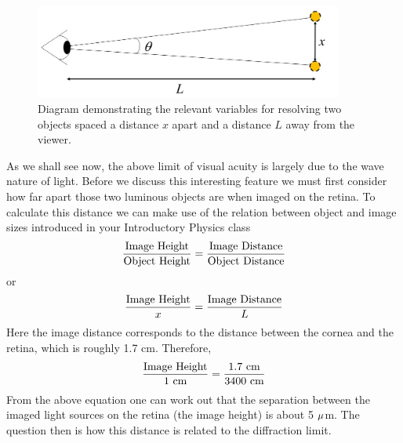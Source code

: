\begin{figure}[b]
	\centering
	\includegraphics[width=4.0in]{./figures/Topic5/Fig5-11.jpg}
	\caption{Diagram demonstrating the relevant variables for resolving two objects spaced a distance $x$ apart and a distance $L$ away from the viewer.}
	\label{Fig5-11}
\end{figure}

As we shall see now, the above limit of visual acuity is largely due to the wave nature of light. Before we discuss this interesting feature we must first consider how far apart those two luminous objects are when imaged on the retina. To calculate this distance we can make use of the relation between object and image sizes introduced in your Introductory Physics class
$$\frac{\rm Image~Height}{\rm Object~Height} = \frac{\rm Image~Distance}{\rm Object~Distance}$$
or
$$\frac{\rm Image~Height}{x}=\frac{\rm Image~Distance}{L}$$
Here the image distance corresponds to the distance between the cornea and the retina, which is roughly 1.7 cm. Therefore,
$$\frac{\rm Image~Height}{1~{\rm cm}}=\frac{1.7~{\rm cm}}{3400~{\rm cm}}$$
From the above equation one can work out that the separation between the imaged light sources on the retina (the image height) is about 5 $\rm \mu$m.  The question then is how this distance is related to the diffraction limit.

